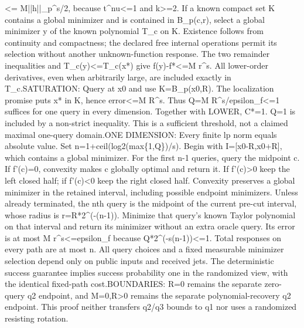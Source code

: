 \documentclass[10pt,a4paper]{article}
\begin{document}
<=\allowbreak{} M||h||\_\allowbreak{}p\textasciicircum{}s/\allowbreak{}2,\allowbreak{} because t\textasciicircum{}nu<=\allowbreak{}1 and k>=\allowbreak{}2. If a known compact set K contains a global minimizer and is contained in B\_\allowbreak{}p(c,\allowbreak{}r),\allowbreak{} select a global minimizer y of the known polynomial T\_\allowbreak{}c on K. Existence follows from continuity and compactness;\allowbreak{} the declared free internal operations permit its selection without another unknown-function response. The two remainder inequalities and T\_\allowbreak{}c(y)<=\allowbreak{}T\_\allowbreak{}c(x*) give f(y)-f*<=\allowbreak{}M r\textasciicircum{}s. All lower-order derivatives,\allowbreak{} even when arbitrarily large,\allowbreak{} are included exactly in T\_\allowbreak{}c.\newline{}SATURATION:\allowbreak{} Query at x0 and use K=\allowbreak{}B\_\allowbreak{}p(x0,\allowbreak{}R). The localization promise puts x* in K,\allowbreak{} hence error<=\allowbreak{}M R\textasciicircum{}s. Thus Q=\allowbreak{}M R\textasciicircum{}s/\allowbreak{}epsilon\_\allowbreak{}f<=\allowbreak{}1 suffices for one query in every dimension. Together with LOWER,\allowbreak{} C*=\allowbreak{}1. Q=\allowbreak{}1 is included by a non-strict inequality. This is a sufficient threshold,\allowbreak{} not a claimed maximal one-query domain.\newline{}ONE DIMENSION:\allowbreak{} Every finite lp norm equals absolute value. Set n=\allowbreak{}1+ceil(log2(max\{1,\allowbreak{}Q\})/\allowbreak{}s). Begin with I=\allowbreak{}[x0-R,\allowbreak{}x0+R],\allowbreak{} which contains a global minimizer. For the first n-1 queries,\allowbreak{} query the midpoint c. If f'(c)=\allowbreak{}0,\allowbreak{} convexity makes c globally optimal and return it. If f'(c)>0 keep the left closed half;\allowbreak{} if f'(c)<0 keep the right closed half. Convexity preserves a global minimizer in the retained interval,\allowbreak{} including possible endpoint minimizers. Unless already terminated,\allowbreak{} the nth query is the midpoint of the current pre-cut interval,\allowbreak{} whose radius is r=\allowbreak{}R*2\textasciicircum{}(-(n-1)). Minimize that query's known Taylor polynomial on that interval and return its minimizer without an extra oracle query. Its error is at most M r\textasciicircum{}s<=\allowbreak{}epsilon\_\allowbreak{}f because Q*2\textasciicircum{}(-s(n-1))<=\allowbreak{}1. Total responses on every path are at most n. All query choices and a fixed measurable minimizer selection depend only on public inputs and received jets. The deterministic success guarantee implies success probability one in the randomized view,\allowbreak{} with the identical fixed-path cost.\newline{}BOUNDARIES:\allowbreak{} R=\allowbreak{}0 remains the separate zero-query q2 endpoint,\allowbreak{} and M=\allowbreak{}0,\allowbreak{}R>0 remains the separate polynomial-recovery q2 endpoint. This proof neither transfers q2/\allowbreak{}q3 bounds to q1 nor uses a randomized resisting rotation.\par\endgroup
\end{document}
